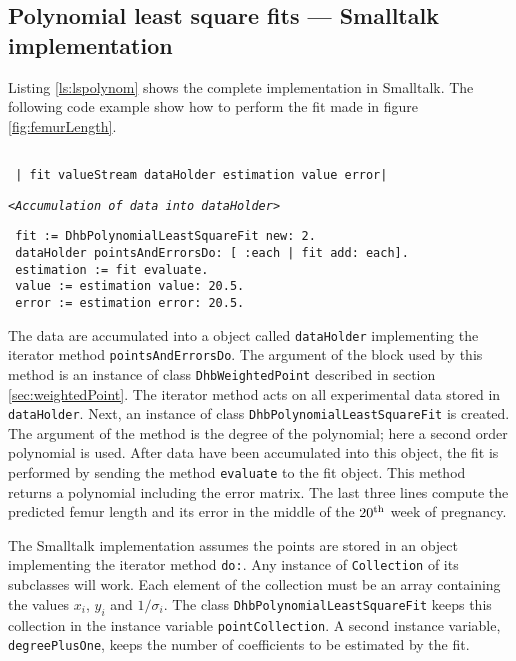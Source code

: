 \documentclass[twoside]{book}
\begin{document}
\subsection{Polynomial least square fits --- Smalltalk  implementation}
\label{sec:slsfpol} Listing \ref{ls:lspolynom} shows the complete
implementation in Smalltalk. The following code example show how
to perform the fit made in figure \ref{fig:femurLength}.
\begin{codeExample}
\begin{verbatim}

 | fit valueStream dataHolder estimation value error|
\end{verbatim}
 \hfil {\tt<\sl Accumulation of data into \tt dataHolder>}
\begin{verbatim}
 fit := DhbPolynomialLeastSquareFit new: 2.
 dataHolder pointsAndErrorsDo: [ :each | fit add: each].
 estimation := fit evaluate.
 value := estimation value: 20.5.
 error := estimation error: 20.5.
\end{verbatim}
\end{codeExample}
The data are accumulated into a object called {\tt dataHolder}
implementing the iterator method {\tt pointsAndErrorsDo}. The
argument of the block used by this method is an instance of class
{\tt DhbWeightedPoint} described in section
\ref{sec:weightedPoint}. The iterator method acts on all
experimental data stored in {\tt dataHolder}. Next, an instance of
class {\tt DhbPolynomialLeastSquareFit} is created. The argument
of the method is the degree of the polynomial; here a second order
polynomial is used. After data have been accumulated into this
object, the fit is performed by sending the method {\tt evaluate}
to the fit object. This method returns a polynomial including the
error matrix. The last three lines compute the predicted femur
length and its error in the middle of the $20^{\mathop{\rm th}}$ week of
pregnancy.

The Smalltalk implementation assumes the points are stored in an
object implementing the iterator method {\tt do:}. Any instance of
{\tt Collection} of its subclasses will work. Each element of the
collection must be an array containing the values $x_i$, $y_i$ and
$1/\sigma_i$. The class {\tt DhbPolynomialLeastSquareFit} keeps
this collection in the instance variable {\tt pointCollection}. A
second instance variable, {\tt degreePlusOne}, keeps the number of
coefficients to be estimated by the fit.
\end{document}
